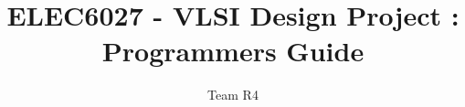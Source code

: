 \documentclass[12pt]{article}
\author{Team R4}
\title{ELEC6027 - VLSI Design Project : Programmers Guide}
\begin{document}
\maketitle
\newpage

\listoftodos
\tableofcontents
\newpage








\newpage
\appendix

	
\end{document}
